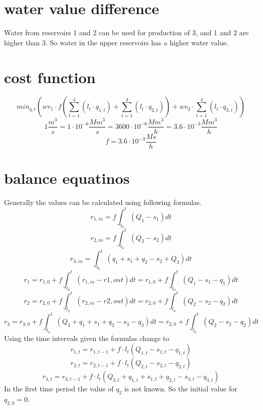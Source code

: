 \documentclass{article}
\begin{document}
\section{water value difference}
Water from reservoirs 1 and 2 can be used for production of 3, and 1 and 2 are higher than 3. So water in the upper reservoirs has a higher water value.
\section{cost function}
\begin{equation}
min_{q,t}(wv_1\cdot f(\sum_{t=1}^4(l_t\cdot q_{1,t})+\sum_{t=1}^4(l_t\cdot q_{2,t}))+wv_2\cdot \sum_{t=1}^4(l_t\cdot q_{3,t}))
\end{equation}
\begin{equation}
1\frac{m^3}{s}=1\cdot 10^{-6}\frac{Mm^3}{s}=3600\cdot 10^{-6}\frac{Mm^3}{h}=3.6\cdot 10^{-3}\frac{Mm^3}{h}
\end{equation}
\begin{equation}
f=3.6\cdot 10^{-3}\frac{Ms}{h}
\end{equation}
\section{balance equatinos}
Generally the values can be calculated using following formulas.
\begin{equation}
r_{1,in}=f\int_{t_0}^{t}(Q_1-s_1)dt
\end{equation}
\begin{equation}
r_{2,in}=f\int_{t_0}^{t}(Q_2-s_2)dt
\end{equation}
\begin{equation}
r_{3,in}=\int_{t_0}^{t}(q_1+s_1+q_2-s_2+Q_3)dt
\end{equation}
\begin{equation}
r_{1}=r_{1,0}+f\int_{t_0}^{t}(r_{1,in}-r{1,out})dt = r_{1,0}+f\int_{t_0}^{t}(Q_1-s_1-q_1)dt
\end{equation}
\begin{equation}
r_{2}=r_{2,0}+f\int_{t_0}^{t}(r_{2,in}-r{2,out})dt = r_{2,0}+f\int_{t_0}^{t}(Q_2-s_2-q_2)dt
\end{equation}
\begin{equation}
r_{3}=r_{3,0}+f\int_{t_0}^{t}(Q_3+q_1+s_1+q_2-s_3-q_3)dt = r_{2,0}+f\int_{t_0}^{t}(Q_2-s_2-q_2)dt
\end{equation}
Using the time intervals given the formulas change to
\begin{equation}
r_{1,t}=r_{1,t-1}+f\cdot l_t(Q_{1,t}-s_{1,t}-q_{1,t})
\end{equation}
\begin{equation}
r_{2,t}=r_{2,t-1}+f\cdot l_t(Q_{2,t}-s_{2,t}-q_{2,t})
\end{equation}
\begin{equation}
r_{3,t}=r_{3,t-1}+f\cdot l_t(Q_{3,t}+q_{1,t}+s_{1,t}+q_{2,t}-s_{3,t}-q_{3,t})
\end{equation}
In the first time period the value of $q_{2}$ is not known. So the initial value for $q_{2,0}=0$.
\end{document}
